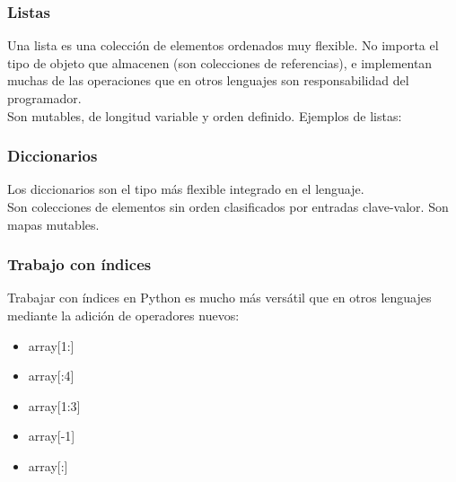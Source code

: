 \documentclass{beamer}
\begin{document}
\begin{frame}
\frametitle{Listas}
Una lista es una colección de elementos ordenados muy flexible. No importa el tipo de objeto que almacenen (son colecciones de referencias), e implementan muchas de las operaciones que en otros lenguajes son responsabilidad del programador.\\
Son mutables, de longitud variable y orden definido.
Ejemplos de listas:
\end{frame}

\begin{frame}
\frametitle{Diccionarios}
Los diccionarios son el tipo más flexible integrado en el lenguaje.\\
Son colecciones de elementos sin orden clasificados por entradas clave-valor. Son mapas mutables.
\end{frame}

\begin{frame}
\frametitle{Trabajo con índices}
Trabajar con índices en Python es mucho más versátil que en otros lenguajes mediante la adición de operadores nuevos:
\begin{itemize}
	\item array[1:]
	\item array[:4]
	\item array[1:3]
	\item array[-1]
	\item array[:]
\end{itemize}
\end{frame}
\end{document}
